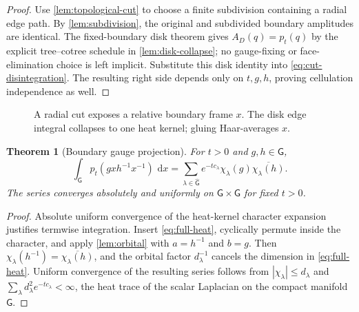 \documentclass[11pt]{article}
\newtheorem{theorem}{Theorem}[section]
\theoremstyle{remark}
\newcommand{\G}{\mathsf G}
\newcommand{\dd}{\,\mathrm d}
\begin{document}
\begin{proof}
Use \cref{lem:topological-cut} to choose a finite subdivision containing a
radial edge path.  By \cref{lem:subdivision}, the original and subdivided
boundary amplitudes are identical.  The fixed-boundary disk theorem gives
$A_D(q)=p_t(q)$ by the explicit tree--cotree schedule in
\cref{lem:disk-collapse}; no gauge-fixing or face-elimination choice is left
implicit.
Substitute this disk identity into \eqref{eq:cut-disintegration}.  The resulting
right side depends only on $t,g,h$, proving cellulation independence as well.
\end{proof}

\begin{figure}[t]
\centering
{}
\caption{A radial cut exposes a relative boundary frame $x$.  The disk edge
integral collapses to one heat kernel; gluing Haar-averages $x$.}
\label{fig:cut}
\end{figure}

\begin{theorem}[Boundary gauge projection]\label{thm:projection}
For $t>0$ and $g,h\in\G$,
\begin{equation}\label{eq:projection}
 \int_\G p_t(gxh^{-1}x^{-1})\,\dd x
 =\sum_{\lambda\in\widehat{\G}}e^{-tc_\lambda}
 \chi_\lambda(g)\overline{\chi_\lambda(h)}.
\end{equation}
The series converges absolutely and uniformly on $\G\times\G$ for fixed
$t>0$.
\end{theorem}

\begin{proof}
Absolute uniform convergence of the heat-kernel character expansion justifies
termwise integration.  Insert \eqref{eq:full-heat}, cyclically permute inside
the character, and apply \cref{lem:orbital} with $a=h^{-1}$ and $b=g$.
Then $\chi_\lambda(h^{-1})=\overline{\chi_\lambda(h)}$, and the orbital factor
$d_\lambda^{-1}$ cancels the dimension in \eqref{eq:full-heat}.  Uniform
convergence of the resulting series follows from
$|\chi_\lambda|\le d_\lambda$ and
$\sum_\lambda d_\lambda^2e^{-tc_\lambda}<\infty$, the heat trace of the
scalar Laplacian on the compact manifold $\G$.
\end{proof}
\end{document}
